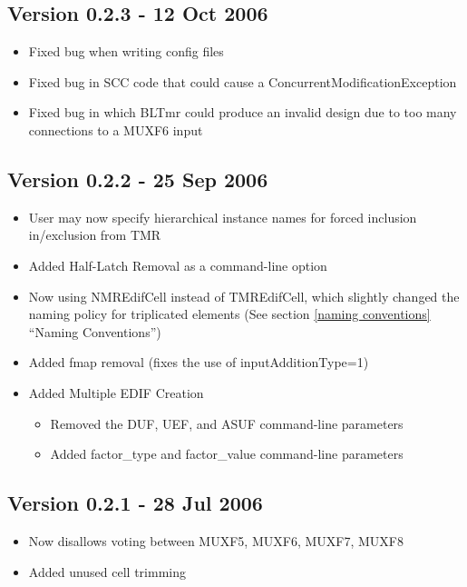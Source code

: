 \documentclass[english]{article}
\begin{document}
\subsection*{Version 0.2.3 - 12 Oct 2006}
\begin{itemize}
\item Fixed bug when writing config files
\item Fixed bug in SCC code that could cause a ConcurrentModificationException
\item Fixed bug in which BLTmr could produce an invalid design due to too many
  connections to a MUXF6 input
\end{itemize}

\subsection*{Version 0.2.2 - 25 Sep 2006}
\begin{itemize}
  \item User may now specify hierarchical instance names for forced inclusion
  in/exclusion from TMR
  \item Added Half-Latch Removal as a command-line option
  \item Now using NMREdifCell instead of TMREdifCell, which slightly changed the
  naming policy for triplicated elements (See section \ref{naming conventions}
  ``Naming Conventions'')
  \item Added fmap removal (fixes the use of inputAdditionType=1)
  \item Added Multiple EDIF Creation
  \begin{itemize}
    \item Removed the DUF, UEF, and ASUF command-line parameters
    \item Added factor\_type and factor\_value command-line parameters
  \end{itemize}
\end{itemize}

\subsection*{Version 0.2.1 - 28 Jul 2006}
\begin{itemize}
\item Now disallows voting between MUXF5, MUXF6, MUXF7, MUXF8
\item Added unused cell trimming
\end{itemize}
\end{document}

